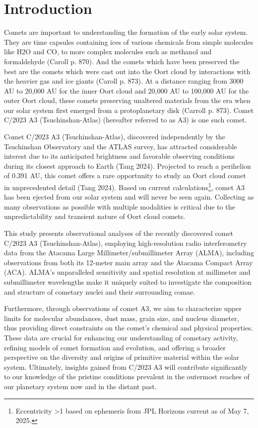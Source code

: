 \section{Introduction}\label{introduction}

Comets are important to understanding the formation of the early solar system. They are time capsules containing ices of various chemicals from simple molecules like H2O and CO, to more complex molecules such as methanol and formaldehyde (Caroll p. 870). And the comets which have been preserved the best are the comets which were cast out into the Oort cloud by interactions with the heavier gas and ice giants (Caroll p. 873). At a distance ranging from 3000 AU to 20,000 AU for the inner Oort cloud and 20,000 AU to 100,000 AU for the outer Oort cloud, these comets preserving unaltered materials from the era when our solar system first emerged from a protoplanetary disk (Carroll p. 873). Comet C/2023 A3 (Tsuchinshan-Atlas) (hereafter referred to as A3) is one such comet.

Comet C/2023 A3 (Tsuchinshan-Atlas), discovered independently by the Tsuchinshan Observatory and the ATLAS survey, has attracted considerable interest due to its anticipated brightness and favorable observing conditions during its closest approach to Earth (Tang 2024). Projected to reach a perihelion of 0.391 AU, this comet offers a rare opportunity to study an Oort cloud comet in unprecedented detail (Tang 2024). Based on current calculations\footnote{Eccentricity \textgreater{1} based on ephemeris from JPL Horizons current as of May 7, 2025.}, comet A3 has been ejected from our solar system and will never be seen again. Collecting as many observations as possible with multiple modalities is critical due to the unpredictability and transient nature of Oort cloud comets.

This study presents observational analyses of the recently discovered comet C/2023 A3 (Tsuchinshan-Atlas), employing high-resolution radio
interferometry data from the Atacama Large Millimeter/submillimeter Array (ALMA), including observations from both its 12-meter main array
and the Atacama Compact Array (ACA). ALMA's unparalleled sensitivity and spatial resolution at millimeter and submillimeter wavelengths make it uniquely suited to investigate the composition and structure of cometary nuclei and their surrounding comae.

Furthermore, through observations of comet A3, we aim to characterize upper limits for molecular abundances, dust mass, grain size, and nucleus diameter, thus providing direct constraints on the comet's chemical and physical properties. These data are crucial for enhancing our understanding of cometary activity, refining models of comet formation and evolution, and offering a broader perspective on the diversity and origins of primitive material within the solar system. Ultimately, insights gained from C/2023 A3 will contribute significantly to our knowledge of the pristine conditions prevalent in the outermost reaches of our planetary system now and in the distant past.
